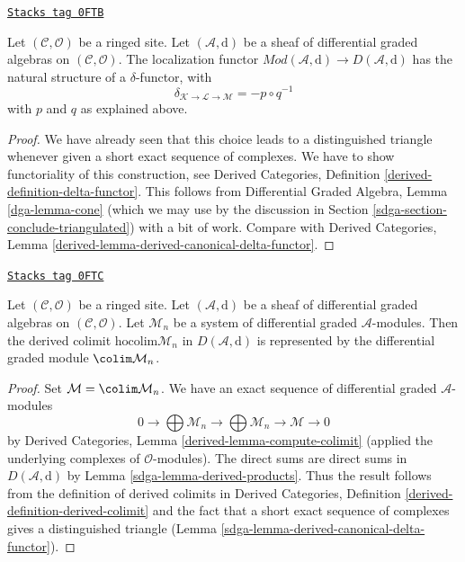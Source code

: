 \begin{lemma}
\label{sdga-lemma-derived-canonical-delta-functor}
\href{https://stacks.math.columbia.edu/tag/0FTB}{\texttt{Stacks tag 0FTB}}

Let $(\mathcal{C}, \mathcal{O})$ be a ringed site. Let
$(\mathcal{A}, \text{d})$ be a sheaf of differential graded algebras
on $(\mathcal{C}, \mathcal{O})$. The localization functor
$\textit{Mod}(\mathcal{A}, \text{d}) \to D(\mathcal{A}, \text{d})$
has the natural structure of a $\delta$-functor, with
$$
\delta_{\mathcal{K} \to \mathcal{L} \to \mathcal{M}} = - p \circ q^{-1}
$$
with $p$ and $q$ as explained above.
\end{lemma}

\begin{proof}
We have already seen that this choice leads to a distinguished
triangle whenever given a short exact sequence of complexes.
We have to show functoriality of this construction, see
Derived Categories, Definition \ref{derived-definition-delta-functor}.
This follows from Differential Graded Algebra, Lemma \ref{dga-lemma-cone}
(which we may use by the discussion in
Section \ref{sdga-section-conclude-triangulated}) with a bit of
work. Compare with
Derived Categories, Lemma \ref{derived-lemma-derived-canonical-delta-functor}.
\end{proof}

\begin{lemma}
\label{sdga-lemma-homotopy-colimit}
\href{https://stacks.math.columbia.edu/tag/0FTC}{\texttt{Stacks tag 0FTC}}

Let $(\mathcal{C}, \mathcal{O})$ be a ringed site. Let
$(\mathcal{A}, \text{d})$ be a sheaf of differential graded algebras
on $(\mathcal{C}, \mathcal{O})$. Let
$\mathcal{M}_n$ be a system of differential graded $\mathcal{A}$-modules.
Then the derived colimit $\text{hocolim} \mathcal{M}_n$ in
$D(\mathcal{A}, \text{d})$ is represented
by the differential graded module $\colim \mathcal{M}_n$.
\end{lemma}

\begin{proof}

Set $\mathcal{M} = \colim \mathcal{M}_n$.
We have an exact sequence of differential graded $\mathcal{A}$-modules
$$
0 \to \bigoplus \mathcal{M}_n \to \bigoplus \mathcal{M}_n \to \mathcal{M} \to 0
$$
by Derived Categories, Lemma \ref{derived-lemma-compute-colimit}
(applied the underlying complexes of $\mathcal{O}$-modules).
The direct sums are direct sums in $D(\mathcal{A}, \text{d})$ by
Lemma \ref{sdga-lemma-derived-products}.
Thus the result follows from the definition
of derived colimits in Derived Categories,
Definition \ref{derived-definition-derived-colimit}
and the fact that a short exact sequence of complexes
gives a distinguished triangle
(Lemma \ref{sdga-lemma-derived-canonical-delta-functor}).
\end{proof}


